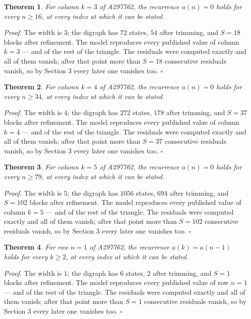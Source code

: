 \documentclass[11pt]{article}
\newtheorem{theorem}{Theorem}
\theoremstyle{definition}
\begin{document}
\begin{theorem} For column $k = 3$ of A297762, the recurrence $a(n) = 0$ holds for every $n \ge 16$, at every index at which it can be stated.\end{theorem}

{\itshape Proof.} The width is $3$; the digraph has $72$ states, $54$ after trimming, and $S = 18$ blocks after refinement. The model reproduces every published value of column $k = 3$ --- and of the rest of the triangle. The residuals were computed exactly and all of them vanish; after that point more than $S = 18$ consecutive residuals vanish, so by Section 3 every later one vanishes too. $\square$

\begin{theorem} For column $k = 4$ of A297762, the recurrence $a(n) = 0$ holds for every $n \ge 34$, at every index at which it can be stated.\end{theorem}

{\itshape Proof.} The width is $4$; the digraph has $272$ states, $178$ after trimming, and $S = 37$ blocks after refinement. The model reproduces every published value of column $k = 4$ --- and of the rest of the triangle. The residuals were computed exactly and all of them vanish; after that point more than $S = 37$ consecutive residuals vanish, so by Section 3 every later one vanishes too. $\square$

\begin{theorem} For column $k = 5$ of A297762, the recurrence $a(n) = 0$ holds for every $n \ge 79$, at every index at which it can be stated.\end{theorem}

{\itshape Proof.} The width is $5$; the digraph has $1056$ states, $694$ after trimming, and $S = 102$ blocks after refinement. The model reproduces every published value of column $k = 5$ --- and of the rest of the triangle. The residuals were computed exactly and all of them vanish; after that point more than $S = 102$ consecutive residuals vanish, so by Section 3 every later one vanishes too. $\square$

\begin{theorem} For row $n = 1$ of A297762, the recurrence $a(k) = a(n-1)$ holds for every $k \ge 2$, at every index at which it can be stated.\end{theorem}

{\itshape Proof.} The width is $1$; the digraph has $6$ states, $2$ after trimming, and $S = 1$ blocks after refinement. The model reproduces every published value of row $n = 1$ --- and of the rest of the triangle. The residuals were computed exactly and all of them vanish; after that point more than $S = 1$ consecutive residuals vanish, so by Section 3 every later one vanishes too. $\square$
\end{document}
